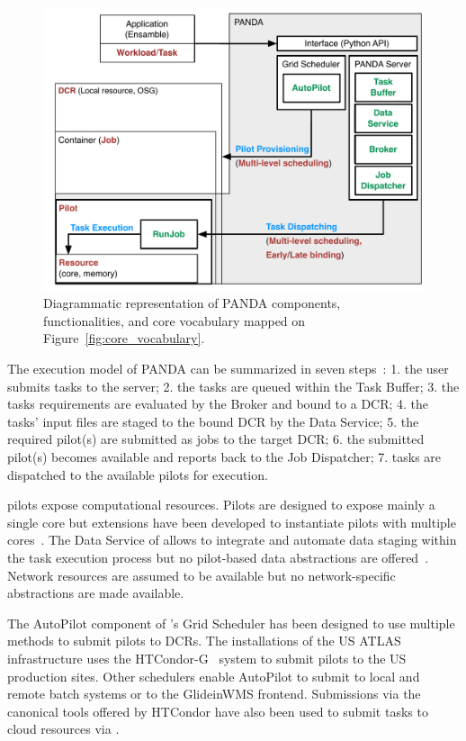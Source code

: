 \documentclass{sig-alternate}
\begin{document}
\begin{figure}[t]
    \centering
        \includegraphics[width=.48\textwidth]{figures/panda_comparison.pdf}
    \caption{Diagrammatic representation of PANDA components, functionalities,
    and core vocabulary mapped on Figure~\ref{fig:core_vocabulary}.}
    \label{fig:panda_comparison}
\end{figure}

The execution model of PANDA can be summarized in seven
steps~\cite{nilsson2011atlas,pandarun_url}: 1. the user submits tasks to the
\panda server; 2. the tasks are queued within the Task Buffer; 3. the tasks
requirements are evaluated by the Broker and bound to a DCR; 4. the tasks' input
files are staged to the bound DCR by the Data Service; 5. the required pilot(s)
are submitted as jobs to the target DCR; 6. the submitted pilot(s) becomes
available and reports back to the Job Dispatcher; 7. tasks are dispatched to the
available pilots for execution.


\panda pilots expose computational resources. Pilots are designed to expose
mainly a single core but extensions have been developed to instantiate pilots
with multiple cores~\cite{crooks2012multi}. The Data Service of \panda allows to
integrate and automate data staging within the task execution process but no
pilot-based data abstractions are offered~\cite{maeno2012pd2p}. Network
resources are assumed to be available but no network-specific abstractions are
made available.

The AutoPilot component of \panda's Grid Scheduler has been designed to use
multiple methods to submit pilots to DCRs. The \panda installations of the US
ATLAS infrastructure uses the HTCondor-G~\cite{frey2002condorG} system to submit
pilots to the US production sites. Other schedulers enable AutoPilot to submit
to local and remote batch systems or to the GlideinWMS frontend. Submissions via
the canonical tools offered by HTCondor have also been used to submit tasks to
cloud resources via
\panda.
\end{document}
